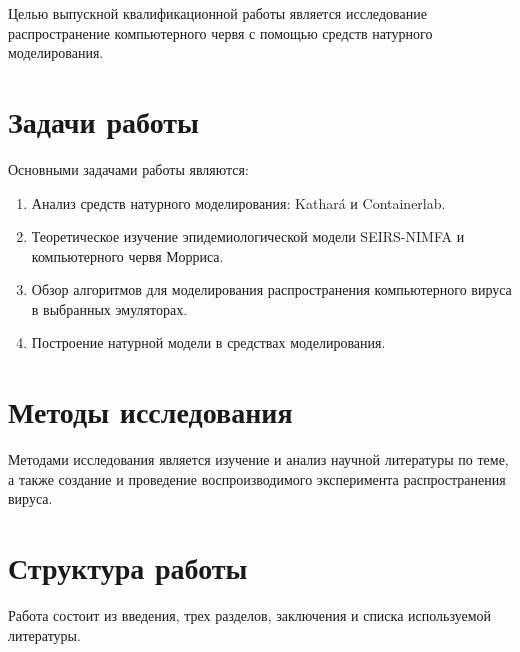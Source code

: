 \documentclass[
  english,
  russian,
  12pt,
  a4paper,
]{phdthesr}
\providecommand{\tightlist}{%
  \setlength{\itemsep}{0pt}\setlength{\parskip}{0pt}}
\begin{document}

Целью выпускной квалификационной работы является исследование
распространение компьютерного червя с помощью средств натурного
моделирования.

\section*{Задачи
работы}\label{ux437ux430ux434ux430ux447ux438-ux440ux430ux431ux43eux442ux44b}


Основными задачами работы являются:

\begin{enumerate}
\def\labelenumi{\arabic{enumi}.}
\tightlist
\item
  Анализ средств натурного моделирования: Kathará и Containerlab.
\item
  Теоретическое изучение эпидемиологической модели SEIRS-NIMFA и
  компьютерного червя Морриса.
\item
  Обзор алгоритмов для моделирования распространения компьютерного
  вируса в выбранных эмуляторах.
\item
  Построение натурной модели в средствах моделирования.
\end{enumerate}

\section*{Методы
исследования}\label{ux43cux435ux442ux43eux434ux44b-ux438ux441ux441ux43bux435ux434ux43eux432ux430ux43dux438ux44f}


Методами исследования является изучение и анализ научной литературы по
теме, а также создание и проведение воспроизводимого эксперимента
распространения вируса.

\section*{Структура
работы}\label{ux441ux442ux440ux443ux43aux442ux443ux440ux430-ux440ux430ux431ux43eux442ux44b}


Работа состоит из введения, трех разделов, заключения и списка
используемой литературы.
\end{document}
